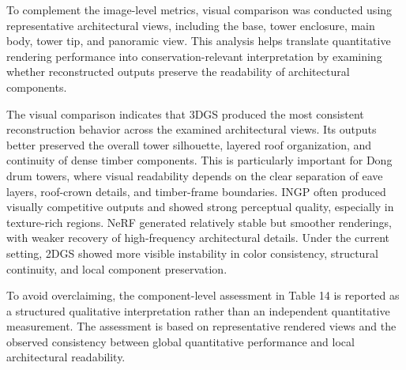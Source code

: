 To complement the image-level metrics, visual comparison was
conducted using representative architectural views, including the base,
tower enclosure, main body, tower tip, and panoramic view. This analysis
helps translate quantitative rendering performance into
conservation-relevant interpretation by examining whether reconstructed
outputs preserve the readability of architectural components.

The visual comparison indicates that 3DGS produced the most
consistent reconstruction behavior across the examined architectural
views. Its outputs better preserved the overall tower silhouette,
layered roof organization, and continuity of dense timber components.
This is particularly important for Dong drum towers, where visual
readability depends on the clear separation of eave layers, roof-crown
details, and timber-frame boundaries. INGP often produced visually
competitive outputs and showed strong perceptual quality, especially in
texture-rich regions. NeRF generated relatively stable but smoother
renderings, with weaker recovery of high-frequency architectural
details. Under the current setting, 2DGS showed more visible instability
in color consistency, structural continuity, and local component
preservation.

To avoid overclaiming, the component-level assessment in Table 14 is
reported as a structured qualitative interpretation rather than an
independent quantitative measurement. The assessment is based on
representative rendered views and the observed consistency between
global quantitative performance and local architectural readability.

